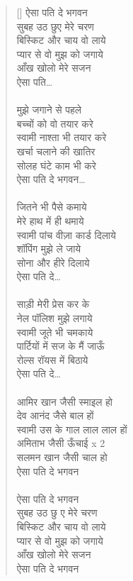 \begin{verse}[\versewidth]\texthindi{
ऐसा पति दे भगवन\\
सुबह उठ छुए मेरे चरण\\
बिस्किट और चाय वो लाये\\
प्यार से वो मुझ को जगाये\\
आँख खोलो मेरे सजन\\
ऐसा पति…\\
\\
मुझे जगाने से पहले\\
बच्चों को वो तयार करे\\
स्वामी नाश्ता भी तयार करे\\
खर्चा चलाने की खातिर\\
सोलह घंटे काम भी करे\\
ऐसा पति दे भगवन…\\
\\
जितने भी पैसे कमाये\\
मेरे हाथ में ही थमाये\\
स्वामी पांच वीज़ा कार्ड दिलाये\\
शॉपिंग मुझे ले जाये\\
सोना और हीरे दिलाये\\
ऐसा पति दे…\\
\\
साड़ी मेरी प्रेस कर के\\
नेल पॉलिश मुझे लगाये\\
स्वामी जूते भी चमकाये\\
पार्टियों में सज के मैं जाऊँ\\
रोल्स रॉयस में बिठाये\\
ऐसा पति दे…\\
\\
आमिर खान जैसी स्माइल हो\\
देव आनंद जैसे बाल हों\\
स्वामी उस के गाल लाल लाल हों\\
अमिताभ जैसी ऊँचाई x 2\\
सलमन खान जैसी चाल हो\\
ऐसा पति दे भगवन\\
\\
ऐसा पति दे भगवन\\
सुबह उठ छु ए मेरे चरण\\
बिस्किट और चाय वो लाये\\
प्यार से वो मुझ को जगाये\\
आँख खोलो मेरे सजन\\
ऐसा पति दे भगवन\\
}\end{verse}

